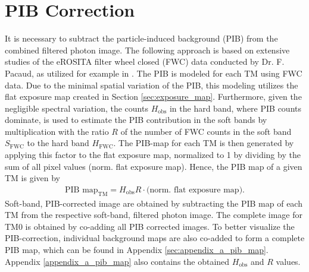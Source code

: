 \section{PIB Correction}
It is necessary to subtract the particle-induced background (PIB) from the combined filtered photon image. The following  approach is based on extensive studies of the eROSITA filter wheel closed (FWC) data conducted by Dr. F. Pacaud, as utilized for example in \citep{Reiprich2021}.  The PIB is modeled for each TM using FWC data. Due to the minimal spatial variation of the PIB, this modeling utilizes the flat exposure map created in Section \ref{sec:exposure_map}. Furthermore, given the negligible spectral variation, the counts \(H_\text{obs}\) in the hard band, where PIB counts dominate, is used to estimate the PIB contribution in the soft bands by multiplication with the ratio \(R\) of the number of FWC counts in the soft band \(S_{\text{FWC}}\) to the hard band \(H_\text{FWC}\). The PIB-map for each TM is then generated by applying this factor to the flat exposure map, normalized to 1 by dividing by the sum of all pixel values (norm. flat exposure map). Hence, the PIB map of a given TM is given by
\begin{align*}
    \text{PIB map}_\text{TM} = H_\text{obs}R\cdot\bigl(\text{norm. flat exposure map}\bigr).
\end{align*}
Soft-band, PIB-corrected image are obtained by subtracting the PIB map of each TM from the respective soft-band, filtered photon image. The complete image for TM0 is obtained by co-adding all PIB corrected images. To better visualize the PIB-correction, individual background maps are also co-added to form a complete PIB map, which can be found in Appendix \ref{sec:appendix_a_pib_map}. Appendix \ref{appendix_a_pib_map} also contains the obtained \(H_\text{obs}\) and \(R\) values.
%
